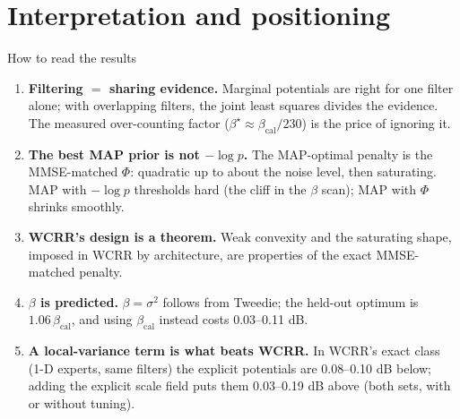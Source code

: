 \documentclass[10pt,aspectratio=169]{beamer}
\newcommand{\bcal}{\beta_{\mathrm{cal}}}
\begin{document}
\section{Interpretation and positioning}

\begin{frame}{How to read the results}
\begin{enumerate}
\item \textbf{Filtering $=$ sharing evidence.} Marginal potentials are right for one filter
      alone; with overlapping filters, the joint least squares divides the evidence.
      The measured over-counting factor ($\beta^\star\approx\bcal/230$) is the price of ignoring it.
\item \textbf{The best MAP prior is not $-\log p$.} The MAP-optimal penalty is the
      MMSE-matched $\Phi$: quadratic up to about the noise level, then saturating. MAP with
      $-\log p$ thresholds hard (the cliff in the $\beta$ scan); MAP with $\Phi$ shrinks smoothly.
\item \textbf{WCRR's design is a theorem.} Weak convexity and the saturating shape, imposed in
      WCRR by architecture, are properties of the exact MMSE-matched penalty.
\item \textbf{$\beta$ is predicted.} $\beta=\sigma^2$ follows from Tweedie; the held-out optimum
      is $1.06\,\bcal$, and using $\bcal$ instead costs 0.03--0.11 dB.
\item \textbf{A local-variance term is what beats WCRR.} In WCRR's exact class (1-D experts,
      same filters) the explicit potentials are 0.08--0.10 dB below; adding the explicit scale
      field puts them 0.03--0.19 dB above (both sets, with or without tuning).
\end{enumerate}
\end{frame}
\end{document}
